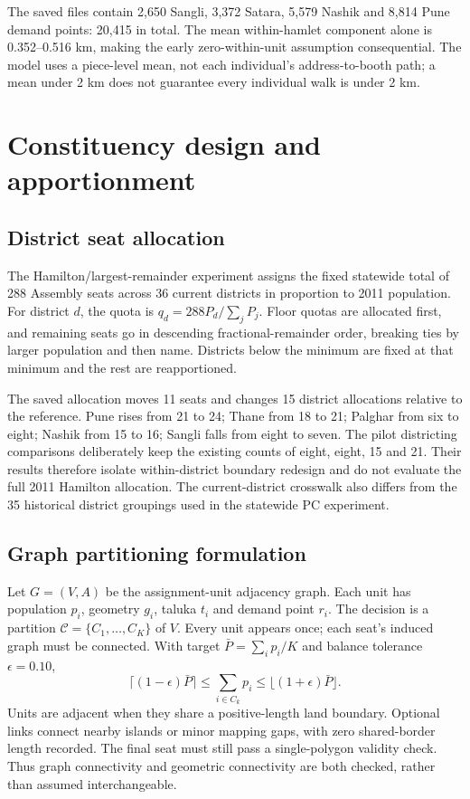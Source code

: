 \documentclass[11pt,a4paper,oneside]{report}
\newcommand{\source}[1]{\par\nopagebreak[4]{\footnotesize\color{teal}Evidence: #1.}\par}
\begin{document}
\enlargethispage{3\baselineskip}
The saved files contain 2,650 Sangli, 3,372 Satara, 5,579 Nashik and 8,814 Pune demand points: 20,415 in total. The mean within-hamlet component alone is 0.352--0.516 km, making the early zero-within-unit assumption consequential. The model uses a piece-level mean, not each individual's address-to-booth path; a mean under 2 km does not guarantee every individual walk is under 2 km.
\source{[S7]}

\chapter{Constituency design and apportionment}
\section{District seat allocation}
The Hamilton/largest-remainder experiment assigns the fixed statewide total of 288 Assembly seats across 36 current districts in proportion to 2011 population. For district $d$, the quota is $q_d=288P_d/\sum_jP_j$. Floor quotas are allocated first, and remaining seats go in descending fractional-remainder order, breaking ties by larger population and then name. Districts below the minimum are fixed at that minimum and the rest are reapportioned.

The saved allocation moves 11 seats and changes 15 district allocations relative to the reference. Pune rises from 21 to 24; Thane from 18 to 21; Palghar from six to eight; Nashik from 15 to 16; Sangli falls from eight to seven. The pilot districting comparisons deliberately keep the existing counts of eight, eight, 15 and 21. Their results therefore isolate within-district boundary redesign and do not evaluate the full 2011 Hamilton allocation. The current-district crosswalk also differs from the 35 historical district groupings used in the statewide PC experiment.
\source{[S4]}

\section{Graph partitioning formulation}
Let $G=(V,A)$ be the assignment-unit adjacency graph. Each unit has population $p_i$, geometry $g_i$, taluka $t_i$ and demand point $r_i$. The decision is a partition $\mathcal{C}=\{C_1,\ldots,C_K\}$ of $V$. Every unit appears once; each seat's induced graph must be connected. With target $\bar P=\sum_i p_i/K$ and balance tolerance $\epsilon=0.10$,
\begin{equation}
 \lceil(1-\epsilon)\bar P\rceil\leq \sum_{i\in C_k}p_i\leq\lfloor(1+\epsilon)\bar P\rfloor.
\end{equation}
Units are adjacent when they share a positive-length land boundary. Optional links connect nearby islands or minor mapping gaps, with zero shared-border length recorded. The final seat must still pass a single-polygon validity check. Thus graph connectivity and geometric connectivity are both checked, rather than assumed interchangeable.
\end{document}
